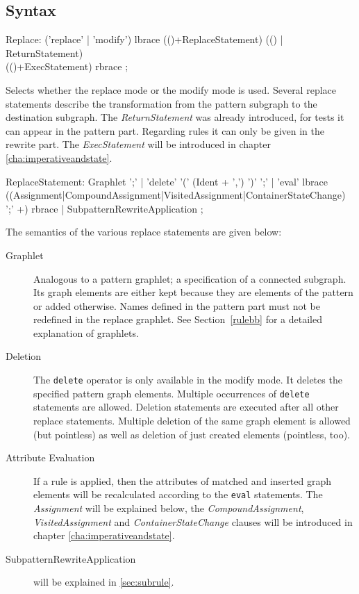 \subsection{Syntax}

\begin{rail}
  Replace: ('replace' | 'modify') lbrace (()+ReplaceStatement) (() | ReturnStatement) \\
  (()+ExecStatement) rbrace ;
\end{rail}\label{replclause}
Selects whether the replace mode or the modify mode is used.
Several replace statements describe the transformation from the pattern subgraph to the destination subgraph.
The \emph{ReturnStatement} was already introduced, for tests it can appear in the pattern part.
Regarding rules it can only be given in the rewrite part.
The \emph{ExecStatement} will be introduced in chapter \ref{cha:imperativeandstate}.

\begin{rail}
  ReplaceStatement:
    Graphlet ';' |
    'delete' '(' (Ident + ',') ')' ';' |
    'eval' lbrace ((Assignment|CompoundAssignment|VisitedAssignment|ContainerStateChange) ';' +) rbrace |
    SubpatternRewriteApplication
    ;
\end{rail}\label{replstmt}
The semantics of the various replace statements are given below:
\begin{description}
  \item[Graphlet] Analogous to a pattern graphlet; a specification of a connected subgraph. Its graph elements are either kept because they are elements of the pattern or added otherwise. Names defined in the pattern part must not be redefined in the replace graphlet. See Section~\ref{rulebb} for a detailed explanation of graphlets.
  \item[Deletion] The \texttt{delete} operator is only available in the modify mode. It deletes the specified pattern graph elements. Multiple occurrences of \texttt{delete} statements are allowed. Deletion statements are executed after all other replace statements. Multiple deletion of the same graph element is allowed (but pointless) as well as deletion of just created elements (pointless, too).
  \item[Attribute Evaluation] If a rule is applied, then the attributes of matched and inserted graph elements will be recalculated according to the \texttt{eval} statements. The \emph{Assignment} will be explained below, the \emph{CompoundAssignment}, \emph{VisitedAssignment} and \emph{ContainerStateChange} clauses will be introduced in chapter \ref{cha:imperativeandstate}.
  \item[SubpatternRewriteApplication] will be explained in \ref{sec:subrule}.
\end{description}

